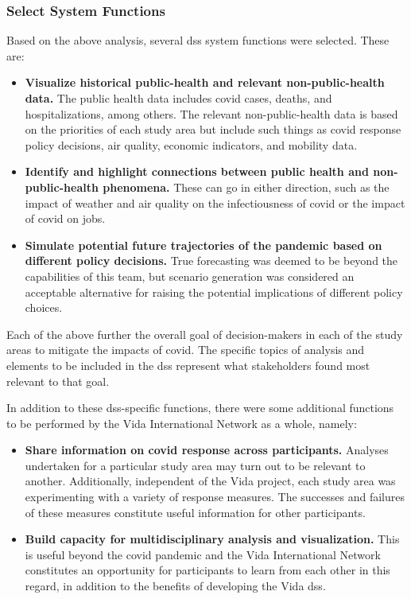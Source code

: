 \begin{landscape}
\begin{longtable}{| C{2cm} |  L{5.33cm} | L{5.33cm} | L{5.33cm} |}
\end{longtable}

\end{landscape}


\subsubsection{Select System Functions}

Based on the above analysis, several \ac{dss} system functions were selected. These are:

\begin{itemize}[itemsep=0pt,parsep=0pt]
	\item{\textbf{Visualize historical public-health and relevant non-public-health data.} The public health data includes \ac{covid} cases, deaths, and hospitalizations, among others. The relevant non-public-health data is based on the priorities of each study area but include such things as \ac{covid} response policy decisions, air quality, economic indicators, and mobility data.}
	\item{\textbf{Identify and highlight connections between public health and non-public-health phenomena.} These can go in either direction, such as the impact of weather and air quality on the infectiousness of \ac{covid} or the impact of \ac{covid} on jobs.}
	\item{\textbf{Simulate potential future trajectories of the pandemic based on different policy decisions.} True forecasting was deemed to be beyond the capabilities of this team, but scenario generation was considered an acceptable alternative for raising the potential implications of different policy choices.} 
\end{itemize}

Each of the above further the overall goal of decision-makers in each of the study areas to mitigate the impacts of \ac{covid}. The specific topics of analysis and elements to be included in the \ac{dss} represent what stakeholders found most relevant to that goal.

In addition to these \ac{dss}-specific functions, there were some additional functions to be performed by the Vida International Network as a whole, namely:

\begin{itemize}[itemsep=0pt,parsep=0pt]
	\item{\textbf{Share information on \ac{covid} response across participants.} Analyses undertaken for a particular study area may turn out to be relevant to another. Additionally, independent of the Vida project, each study area was experimenting with a variety of response measures. The successes and failures of these measures constitute useful information for other participants.}
	\item{\textbf{Build capacity for multidisciplinary analysis and visualization.} This is useful beyond the \ac{covid} pandemic and the Vida International Network constitutes an opportunity for participants to learn from each other in this regard, in addition to the benefits of developing the Vida \ac{dss}.}
\end{itemize}

